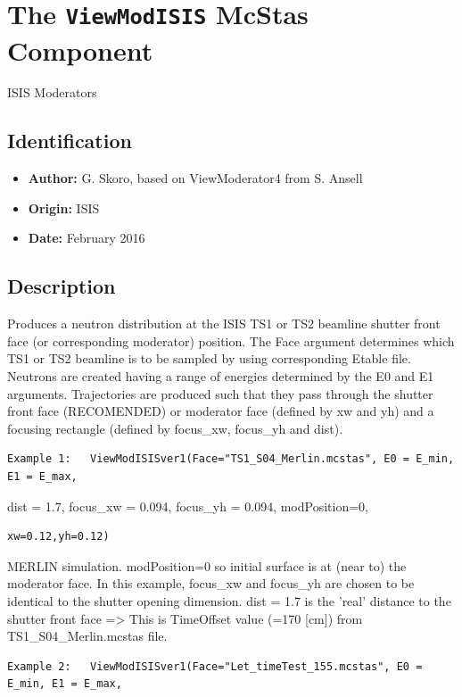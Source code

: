 \section{The \texttt{ViewModISIS} McStas Component}
ISIS Moderators

\subsection*{Identification}
\begin{itemize}
  \item \textbf{Author:} G. Skoro, based on ViewModerator4 from S. Ansell
  \item \textbf{Origin:} ISIS
  \item \textbf{Date:} February 2016
\end{itemize}

\subsection*{Description}
Produces a neutron distribution at the ISIS TS1 or TS2 beamline shutter front face (or corresponding moderator) position. The Face argument determines which TS1 or TS2 beamline is to be sampled by using corresponding Etable file. Neutrons are created having a range of energies determined by the E0 and E1 arguments. Trajectories are produced such that they pass through the shutter front face (RECOMENDED) or moderator face (defined by xw and yh) and a focusing rectangle (defined by focus\_xw, focus\_yh and dist).

\begin{verbatim}
Example 1:   ViewModISISver1(Face="TS1_S04_Merlin.mcstas", E0 = E_min, E1 = E_max,
\end{verbatim}

dist = 1.7, focus\_xw = 0.094, focus\_yh = 0.094, modPosition=0,

\begin{verbatim}
xw=0.12,yh=0.12)
\end{verbatim}

MERLIN simulation. modPosition=0 so initial surface is at (near to) the moderator face. In this example, focus\_xw and focus\_yh are chosen to be identical to the shutter opening dimension. dist = 1.7 is the 'real' distance to the shutter front face =\textgreater{} This is TimeOffset value (=170 [cm]) from TS1\_S04\_Merlin.mcstas file.

\begin{verbatim}
Example 2:   ViewModISISver1(Face="Let_timeTest_155.mcstas", E0 = E_min, E1 = E_max,
\end{verbatim}

